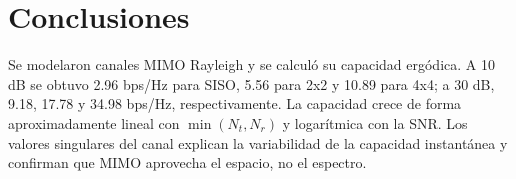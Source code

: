 \documentclass[11pt,a4paper]{article}
\begin{document}
\section{Conclusiones}

Se modelaron canales MIMO Rayleigh y se calculó su capacidad ergódica. A 10 dB se obtuvo
2.96 bps/Hz para SISO, 5.56 para 2x2 y 10.89 para 4x4; a 30 dB, 9.18, 17.78 y
34.98 bps/Hz, respectivamente. La capacidad crece de forma aproximadamente lineal con
$\min(N_t,N_r)$ y logarítmica con la SNR. Los valores singulares del canal explican la
variabilidad de la capacidad instantánea y confirman que MIMO aprovecha el espacio, no el
espectro.
\end{document}
